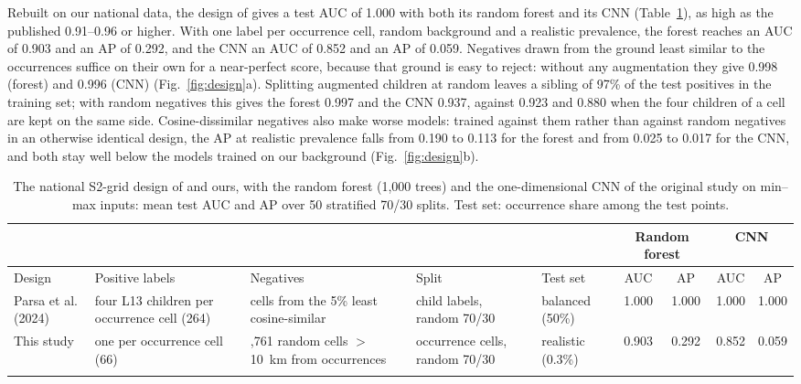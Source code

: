 \documentclass[pdflatex,sn-apa]{sn-jnl}
\begin{document}
Rebuilt on our national data, the design of \citet{Parsa2024} gives a test AUC of 1.000 with both its random forest and its CNN (Table~\ref{tab:nat-design}), as high as the published 0.91--0.96 or higher. With one label per occurrence cell, random background and a realistic prevalence, the forest reaches an AUC of 0.903 and an AP of 0.292, and the CNN an AUC of 0.852 and an AP of 0.059. Negatives drawn from the ground least similar to the occurrences suffice on their own for a near-perfect score, because that ground is easy to reject: without any augmentation they give 0.998 (forest) and 0.996 (CNN) (Fig.~\ref{fig:design}a). Splitting augmented children at random leaves a sibling of 97\% of the test positives in the training set; with random negatives this gives the forest 0.997 and the CNN 0.937, against 0.923 and 0.880 when the four children of a cell are kept on the same side. Cosine-dissimilar negatives also make worse models: trained against them rather than against random negatives in an otherwise identical design, the AP at realistic prevalence falls from 0.190 to 0.113 for the forest and from 0.025 to 0.017 for the CNN, and both stay well below the models trained on our background (Fig.~\ref{fig:design}b).

\begin{table}[t]
\caption{The national S2-grid design of \citet{Parsa2024} and ours, with the random forest (1,000 trees) and the one-dimensional CNN of the original study on min--max inputs: mean test AUC and AP over 50 stratified 70/30 splits. Test set: occurrence share among the test points.}\label{tab:nat-design}
\scriptsize
\setlength{\tabcolsep}{2.5pt}
\begin{tabular*}{\textwidth}{@{\extracolsep\fill}>{\raggedright\arraybackslash}p{1.7cm}>{\raggedright\arraybackslash}p{2.4cm}>{\raggedright\arraybackslash}p{2.5cm}>{\raggedright\arraybackslash}p{1.8cm}>{\raggedright\arraybackslash}p{1.3cm}cccc}
\toprule
 & & & & & \multicolumn{2}{c}{Random forest} & \multicolumn{2}{c}{CNN} \\
\cmidrule{6-7}\cmidrule{8-9}
Design & Positive labels & Negatives & Split & Test set & AUC & AP & AUC & AP \\
\midrule
Parsa et al. (2024) & four L13 children per occurrence cell (264) & 264 cells from the 5\% least cosine-similar & child labels, random 70/30 & balanced (50\%) & 1.000 & 1.000 & 1.000 & 1.000 \\
This study & one per occurrence cell (66) & 34,761 random cells $>$10~km from occurrences & occurrence cells, random 70/30 & realistic (0.3\%) & 0.903 & 0.292 & 0.852 & 0.059 \\
\botrule
\end{tabular*}
\end{table}
\end{document}
